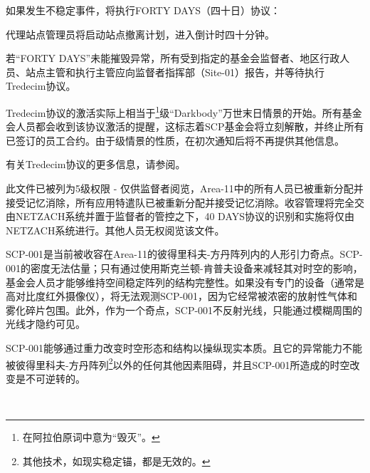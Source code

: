 如果发生不稳定事件，将执行FORTY DAYS（四十日）协议：

代理站点管理员将启动站点撤离计划，进入倒计时四十分钟。







若“FORTY DAYS”未能摧毁异常，所有受到指定的基金会监督者、地区行政人员、站点主管和执行主管应向监督者指挥部（Site-01）报告，并等待执行Tredecim协议。

\hr

Tredecim协议的激活实际上相当于\footnote{在阿拉伯原词中意为“毁灭”。}级“Darkbody”万世末日情景的开始。所有基金会人员都会收到该协议激活的提醒，这标志着SCP基金会将立刻解散，并终止所有已签订的员工合约。由于级情景的性质，在初次通知后将不再提供其他信息。

有关Tredecim协议的更多信息，请参阅。

此文件已被列为5级权限 - 仅供监督者阅览，Area-11中的所有人员已被重新分配并接受记忆消除，所有应用特遣队已被重新分配并接受记忆消除。收容管理将完全交由NETZACH系统并置于监督者的管控之下，40 DAYS协议的识别和实施将仅由NETZACH系统进行。其他人员无权阅览该文件。

SCP-001是当前被收容在Area-11的彼得里科夫-方丹阵列内的人形引力奇点。SCP-001的密度无法估量；只有通过使用斯克兰顿-肯普夫设备来减轻其对时空的影响，基金会人员才能够维持空间稳定阵列的结构完整性。如果没有专门的设备（通常是高对比度红外摄像仪），将无法观测SCP-001，因为它经常被浓密的放射性气体和雾化碎片包围。此外，作为一个奇点，SCP-001不反射光线，只能通过模糊周围的光线才隐约可见。

SCP-001能够通过重力改变时空形态和结构以操纵现实本质。且它的异常能力不能被彼得里科夫-方丹阵列\footnote{其他技术，如现实稳定锚，都是无效的。}以外的任何其他因素阻碍，并且SCP-001所造成的时空改变是不可逆转的。

\newpage

\begin{center}

\hr

\\

\hr

\end{center}

